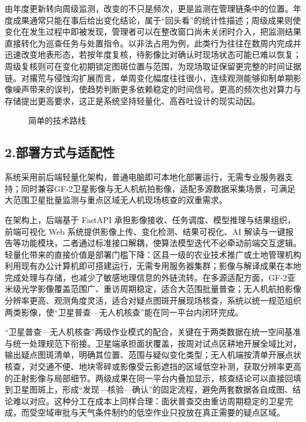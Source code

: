 \documentclass[12pt, a4paper]{ctexart}
\begin{document}
由年度更新转向周级监测，改变的不只是频次，更是监测在管理链条中的位置。年度成果通常只能在事后给出变化结论，属于“回头看”的统计性描述；周级成果则使变化在发生过程中即被发现，管理者可以在整改窗口尚未关闭时介入，把监测结果直接转化为巡查任务与处置指令。以非法占用为例，此类行为往往在数周内完成并迅速改变地表形态，若按年度复核，待影像比对确认时现场状态可能已难以恢复；周级复核则可在变化初期锁定图斑位置与范围，为现场取证保留更完整的时间证据链。对撂荒与侵蚀沟扩展而言，单周变化幅度往往很小，连续观测能够抑制单期影像噪声带来的误判，使趋势判断更多依赖稳定的时间信号。更高的频次也对算力与存储提出更高要求，这正是系统坚持轻量化、高吞吐设计的现实动因。

\begin{figure}[htbp]
    \centering
    \caption{简单的技术路线}
    \label{fig:9}
\end{figure}

\subsection{2.部署方式与适配性}

系统采用前后端轻量化架构，普通电脑即可本地化部署运行，无需专业服务器支持；同时兼容GF-2卫星影像与无人机航拍影像，适配多源数据采集场景，可满足大范围卫星批量监测与重点区域无人机现场核查的双重需求。

在架构上，后端基于 FastAPI 承担影像接收、任务调度、模型推理与结果组织，前端可视化 Web 系统提供影像上传、变化检测、结果可视化、AI 解读与一键报告等功能模块，二者通过标准接口解耦，使算法模型迭代不必牵动前端交互逻辑。轻量化带来的直接价值是部署门槛下降：区县一级的农业技术推广或土地管理机构利用现有办公计算机即可搭建运行，无需专用服务器集群；影像与解译成果在本地完成处理与存储，也减少了敏感地理信息的外链流转。在多源适配方面，GF-2亚米级光学影像覆盖范围广、重访周期稳定，适合大范围批量普查；无人机航拍影像分辨率更高、观测角度灵活，适合对疑点图斑开展现场核查，系统以统一规范组织两类影像，使“卫星普查—无人机核查”能在同一平台内闭环完成。

“卫星普查—无人机核查”两级作业模式的配合，关键在于两类数据在统一空间基准与统一处理规范下衔接。卫星端承担面状覆盖，按周对试点区耕地开展全域比对，输出疑点图斑清单，明确其位置、范围与疑似变化类型；无人机端按清单开展点状核查，对交通不便、地块零碎或影像受云影遮挡的区域低空补测，获取分辨率更高的正射影像与局部细节。两级成果在同一平台内叠加显示，核查结论可以直接回填到卫星图斑上，形成“发现—核验—确认”的固定流程，避免两套数据各自成图、结论难以对应。这种分工在成本上同样合理：面状普查交由重访周期稳定的卫星完成，而受空域审批与天气条件制约的低空作业只投放在真正需要的疑点区域。
\end{document}
